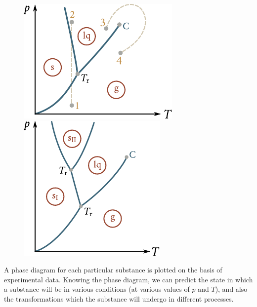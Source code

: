 \begin{figure}[t]
	\begin{minipage}[t]{0.5\linewidth}
		\begin{center}
			\includegraphics[scale=1]{figures/ch_15/fig_15_17.pdf}
			\caption[]{}
			\label{fig:15_17}
		\end{center}
	\end{minipage}
	\hspace{-0.05cm}
	\begin{minipage}[t]{0.5\linewidth}
		\begin{center}
			\includegraphics[scale=1]{figures/ch_15/fig_15_18.pdf}
			\caption[]{}
			\label{fig:15_18}
		\end{center}
	\end{minipage}
	\vspace{-0.4cm}
\end{figure}

A phase diagram for each particular substance is plotted on the basis of experimental data. Knowing the phase diagram, we can predict the state in which a substance will be in various conditions (at various values of $p$ and $T$), and also the transformations which the substance will undergo in different processes.

